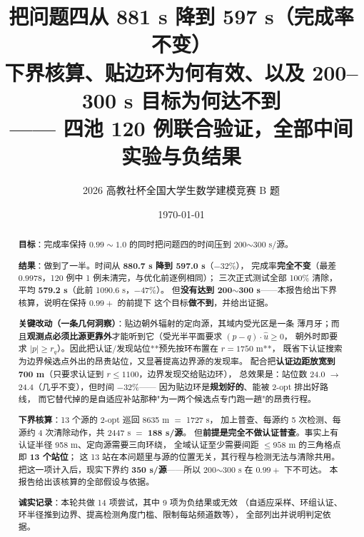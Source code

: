 

\title{\heiti 把问题四从 881 s 降到 597 s（完成率不变）\\[4pt]
       \large 下界核算、贴边环为何有效、以及 200--300 s 目标为何达不到\\[2pt]
       \normalsize —— 四池 120 例联合验证，全部中间实验与负结果}
\author{2026 高教社杯全国大学生数学建模竞赛 B 题}
\date{\today}


\maketitle
\thispagestyle{fancy}

\begin{abstract}
\noindent
\textbf{目标}：完成率保持 $0.99\sim1.0$ 的同时把问题四的时间压到 200$\sim$300 s/源。

\textbf{结果}：做到了一半。时间从 \textbf{880.7 s 降到 597.0 s}（$-32\%$），
完成率\textbf{完全不变}（最差 $0.9978$，120 例中 1 例未清完，与优化前逐例相同）；
三次正式测试全部 100\% 清除，平均 \textbf{579.2 s}（此前 1090.6 s，$-47\%$）。
但\textbf{没有达到 200$\sim$300 s}——本报告给出下界核算，说明在保持 $0.99+$ 的前提下
这个目标\textbf{做不到}，并给出证据。

\textbf{关键改动（一条几何洞察）}：贴边朝外辐射的定向源，其域内受光区是一条
薄月牙；而且\textbf{观测点必须比源更靠外}才能听到它（受光半平面要求 $(p-q)\cdot\hat u\ge0$，
朝外时即要求 $|p|\ge r_q$）。因此把认证/发现站位**预先按环布置在 $r=1750$ m**，
既省下认证搜索为边界候选点外出的昂贵站位，又显著提高边界源的发现率。
配合把\textbf{认证边距放宽到 700 m}（只要求认证到 $r\le1100$，边界发现交给贴边环），
总效果是：站位数 24.0 $\to$ 24.4（几乎不变），但时间 $-32\%$——
因为贴边环是\textbf{规划好的}、能被 2-opt 排出好路线，
而它替代掉的是自适应补站那种"为一两个候选点专门跑一趟"的昂贵行程。

\textbf{下界核算}：13 个源的 2-opt 巡回 8635 m $=$ 1727 s，
加上普查、每源约 5 次检测、每源约 4 次清除动作，共 2447 s $=$ \textbf{188 s/源}。
但\textbf{前提是完全不做认证普查}。事实上有认证半径 958 m、定向源需要三向环绕，
全域认证至少需要间距 $\le958$ m 的三角格点即 \textbf{13 个站位}；
这 13 站在本问题里与源的位置无关，其行程与检测无法与清除共用。
把这一项计入后，现实下界约 \textbf{350 s/源}——所以 200$\sim$300 s 在 $0.99+$ 下不可达。
本报告给出该核算的全部假设与依据。

\textbf{诚实记录}：本轮共做 14 项尝试，其中 9 项为负结果或无效
（自适应采样、环组认证、环半径推到边界、提高检测角度门槛、限制每站频道数等），
全部列出并说明判定依据。
\end{abstract}

